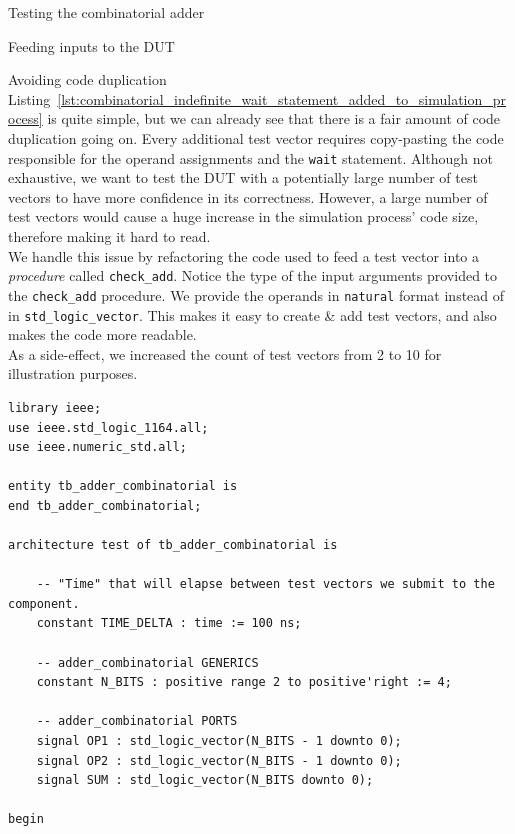 \documentclass[lab]{course}
\begin{document}
\begin{section}{Testing the combinatorial adder}
\begin{subsection}{Feeding inputs to the DUT}
        \clearpage

        \begin{subsubsection}{Avoiding code duplication}
            Listing~\ref{lst:combinatorial_indefinite_wait_statement_added_to_simulation_process} is quite simple, but we can already see that there is a fair amount of code duplication going on. Every additional test vector requires copy-pasting the code responsible for the operand assignments and the \verb+wait+ statement. Although not exhaustive, we want to test the DUT with a potentially large number of test vectors to have more confidence in its correctness. However, a large number of test vectors would cause a huge increase in the simulation process' code size, therefore making it hard to read. \\

            We handle this issue by refactoring the code used to feed a test vector into a \emph{procedure} called \verb+check_add+. Notice the type of the input arguments provided to the \verb+check_add+ procedure. We provide the operands in \verb+natural+ format instead of in \verb+std_logic_vector+. This makes it easy to create \& add test vectors, and also makes the code more readable. \\

            As a side-effect, we increased the count of test vectors from 2 to 10 for illustration purposes.

            \begin{lstlisting}[caption={Refactored test vector feeding code into a \emph{procedure} called \texttt{check\_add}}, captionpos=b, label={lst:combinatorial_refactored_test_vector_feeding_code}]
library ieee;
use ieee.std_logic_1164.all;
use ieee.numeric_std.all;

entity tb_adder_combinatorial is
end tb_adder_combinatorial;

architecture test of tb_adder_combinatorial is

    -- "Time" that will elapse between test vectors we submit to the component.
    constant TIME_DELTA : time := 100 ns;

    -- adder_combinatorial GENERICS
    constant N_BITS : positive range 2 to positive'right := 4;

    -- adder_combinatorial PORTS
    signal OP1 : std_logic_vector(N_BITS - 1 downto 0);
    signal OP2 : std_logic_vector(N_BITS - 1 downto 0);
    signal SUM : std_logic_vector(N_BITS downto 0);

begin


\end{lstlisting}
\end{subsubsection}
\end{subsection}
\end{section}
\end{document}
